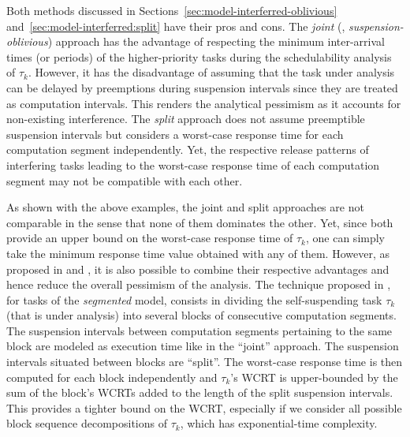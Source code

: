 \label{sec:model-interferred-hybrid}

Both methods discussed in Sections~\ref{sec:model-interferred-oblivious} and~\ref{sec:model-interferred:split} have their pros and cons. The \emph{joint} (\ie, \emph{suspension-oblivious}) approach has the advantage of
respecting the minimum inter-arrival times (or periods) of the higher-priority tasks during the schedulability 
analysis of $\tau_k$. However, it has the disadvantage of assuming that the task under analysis can be delayed by preemptions during suspension intervals since they are treated as computation intervals. 
This renders the analytical pessimism as it accounts for non-existing interference. The \emph{split} approach does not assume  
preemptible suspension intervals but  considers a worst-case response time for each computation segment independently. Yet, the respective
release patterns of interfering tasks leading to the worst-case response time of each computation segment may not be compatible with each other.

As shown with the above examples, the joint and split approaches are not comparable in the sense that none 
of them dominates the other. Yet, since both provide an upper bound on the worst-case response time of $\tau_k$, one can 
simply take the minimum response time value obtained with any of them. However, as proposed in \cite[Chapter 5.4]{bletsas:thesis} and \cite{Huang:multiseg}, 
it is also possible to combine their respective advantages and hence reduce the overall pessimism of the analysis. 
The technique proposed in \cite{bletsas:thesis}, for tasks of the \emph{segmented} model,
consists in dividing the self-suspending task $\tau_k$ (that is under analysis) into several blocks of consecutive 
computation segments. The suspension intervals between computation segments pertaining to the same block are modeled as execution time 
like in the ``joint'' approach. The suspension intervals situated between blocks are ``split''. The worst-case response time is then computed for each 
block independently and $\tau_k$'s WCRT is upper-bounded by the sum of the block's WCRTs added to the length of the split suspension 
intervals. This provides a tighter bound on the WCRT, especially if we consider all possible block sequence decompositions of $\tau_k$, which has exponential-time complexity. 

\label{sec:existing-exact-special}

